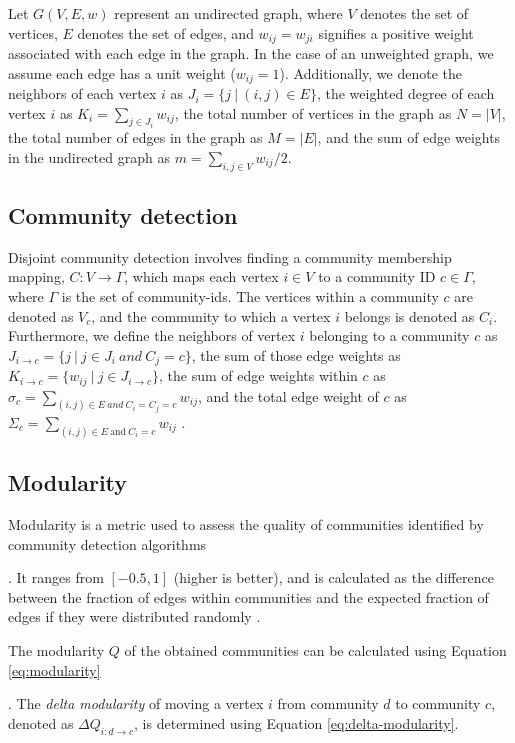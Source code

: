 Let $G(V, E, w)$ represent an undirected graph, where $V$ denotes the set of vertices, $E$ denotes the set of edges, and $w_{ij} = w_{ji}$ signifies a positive weight associated with each edge in the graph. In the case of an unweighted graph, we assume each edge has a unit weight ($w_{ij} = 1$). Additionally, we denote the neighbors of each vertex $i$ as $J_i = \{j\ |\ (i, j) \in E\}$, the weighted degree of each vertex $i$ as $K_i = \sum_{j \in J_i} w_{ij}$, the total number of vertices in the graph as $N = |V|$, the total number of edges in the graph as $M = |E|$, and the sum of edge weights in the undirected graph as $m = \sum_{i, j \in V} w_{ij}/2$.




\subsection{Community detection}

Disjoint community detection involves finding a community membership mapping, $C: V \rightarrow \Gamma$, which maps each vertex $i \in V$ to a community ID $c \in \Gamma$, where $\Gamma$ is the set of community-ids. The vertices within a community $c$ are denoted as $V_c$, and the community to which a vertex $i$ belongs is denoted as $C_i$. Furthermore, we define the neighbors of vertex $i$ belonging to a community $c$ as $J_{i \rightarrow c} = \{j\ |\ j \in J_i\ and\ C_j = c\}$, the sum of those edge weights as $K_{i \rightarrow c} = \{w_{ij}\ |\ j \in J_{i \rightarrow c}\}$, the sum of edge weights within $c$ as $\sigma_c = \sum_{(i, j) \in E\ and\ C_i = C_j = c} w_{ij}$, and the total edge weight of $c$ as $\Sigma_c = \sum_{(i, j) \in E\ \mbox{and}\ C_i = c} w_{ij}$ \cite{com-zarayeneh21}.




\subsection{Modularity}

Modularity is a metric used to assess the quality of communities identified by community detection algorithms \cite{com-newman04}. It ranges from $[-0.5, 1]$ (higher is better), and is calculated as the difference between the fraction of edges within communities and the expected fraction of edges if they were distributed randomly \cite{com-brandes07}. The modularity $Q$ of the obtained communities can be calculated using Equation \ref{eq:modularity}. The \textit{delta modularity} of moving a vertex $i$ from community $d$ to community $c$, denoted as $\Delta Q_{i: d \rightarrow c}$, is determined using Equation \ref{eq:delta-modularity}.


